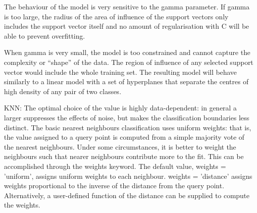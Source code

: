 \documentclass[runningheads]{llncs}
\begin{document}
The behaviour of the model is very sensitive to the gamma parameter. If gamma is too large, the radius of the area of influence of the support vectors only includes the support vector itself and no amount of regularisation with C will be able to prevent overfitting.

When gamma is very small, the model is too constrained and cannot capture the complexity or “shape” of the data. The region of influence of any selected support vector would include the whole training set. The resulting model will behave similarly to a linear model with a set of hyperplanes that separate the centres of high density of any pair of two classes.

KNN: 
The optimal choice of the value  is highly data-dependent: in general a larger  suppresses the effects of noise, but makes the classification boundaries less distinct.
The basic nearest neighbours classification uses uniform weights: that is, the value assigned to a query point is computed from a simple majority vote of the nearest neighbours. Under some circumstances, it is better to weight the neighbours such that nearer neighbours contribute more to the fit. This can be accomplished through the weights keyword. The default value, weights = 'uniform', assigns uniform weights to each neighbour. weights = 'distance' assigns weights proportional to the inverse of the distance from the query point. Alternatively, a user-defined function of the distance can be supplied to compute the weights.
%
%
%
%
%
%
%
%
%
%
%
%
\pagebreak
\end{document}
